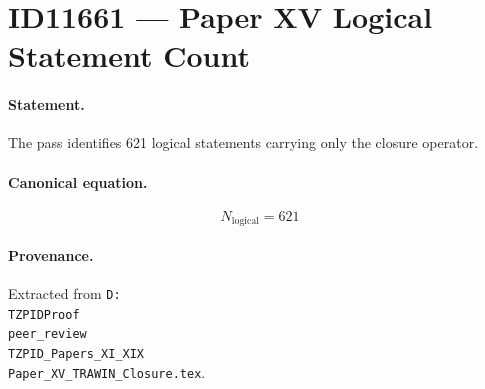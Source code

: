 \section*{ID11661 --- Paper XV Logical Statement Count}

\paragraph{Statement.}
The pass identifies 621 logical statements carrying only the closure operator.

\paragraph{Canonical equation.}
\[
N_{\mathrm{logical}}=621
\]

\paragraph{Provenance.}
Extracted from \texttt{D:\\TZPIDProof\\peer\_review\\TZPID\_Papers\_XI\_XIX\\Paper\_XV\_TRAWIN\_Closure.tex}.

